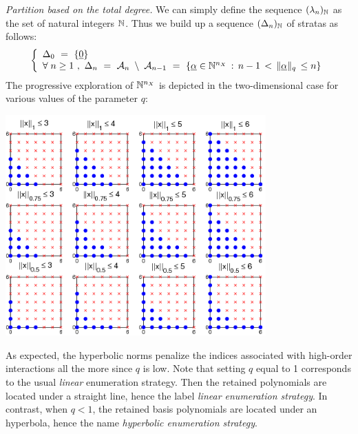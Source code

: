 {\textit{Partition based on the total degree. }  We can simply define the sequence $(\lambda_n)_{{\mathbb N}}$ as the set of natural integers ${\mathbb N}$. Thus we build up a sequence $(\Delta_n)_{{\mathbb N}}$ of stratas as follows:
\begin{equation}
  \left\{
\begin{array}{l}
\Delta_0 \, \, = \, \, \{\underline 0\} \\
\forall \; n  \geq  1 \, \, , \, \, \Delta_n \, \, = \, \, \mathcal{A}_{n} \; \setminus \; \mathcal{A}_{n-1}  \, \, = \, \, 
 \{\underline{\alpha} \in \mathbb{N}^{n_X} \, : \, n - 1 \, < \, \|\underline{\alpha}\|_q \, \leq n \}      \\
\end{array}
\right.
\end{equation}
The progressive exploration of $\mathbb{N}^{n_X}$ is depicted in the two-dimensional case for various values of the parameter $q$:
\begin{center}	 \includegraphics[width = 10cm]{qnorms_2D.png} \end{center} 

As expected, the hyperbolic norms penalize the indices associated with high-order interactions all the more since $q$ is low. Note that setting $q$ equal to 1 corresponds to the usual \emph{linear} enumeration strategy. Then the retained polynomials are located under a straight line, hence the label \emph{linear enumeration strategy}. In contrast, when $q < 1$, the retained basis polynomials are located under an hyperbola, hence the name \emph{hyperbolic enumeration strategy}. \\

}
